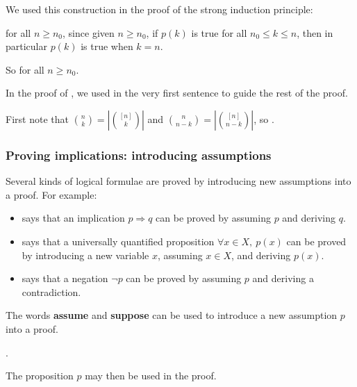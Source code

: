 We used this construction in the proof of the strong induction principle:

\begin{extract}
\label{xtrAssumingImplicationsExample}
 for all $n \ge n_0$, since given $n \ge n_0$, if $p(k)$ is true for all $n_0 \le k \le n$, then in particular $p(k)$ is true when $k=n$.

So  for all $n \ge n_0$.
\end{extract}

In the proof of , we used  in the very first sentence to guide the rest of the proof.

\begin{extract}
\label{xtrAssumingImplicationsExampleTwo}
First note that $\binom{n}{k} = \left| \binom{[n]}{k} \right|$ and $\binom{n}{n-k} = \left| \binom{[n]}{n-k} \right|$, so  .
\end{extract}

\subsubsection*{Proving implications: introducing assumptions}

Several kinds of logical formulae are proved by introducing new assumptions into a proof. For example:
\begin{itemize}
\item {} says that an implication $p \Rightarrow q$ can be proved by assuming $p$ and deriving $q$.
\item {} says that a universally quantified proposition $\forall x \in X,~ p(x)$ can be proved by introducing a new variable $x$, assuming $x \in X$, and deriving $p(x)$.
\item {} says that a negation $\neg p$ can be proved by assuming $p$ and deriving a contradiction.
\end{itemize}

\begin{vocabulary}
\label{vcbTemporaryAssumption}
The words \textbf{assume} and \textbf{suppose} can be used to introduce a new assumption $p$ into a proof.

\begin{vocabtemplate}
 . 
\end{vocabtemplate}

The proposition $p$ may then be used in the proof.
\end{vocabulary}

